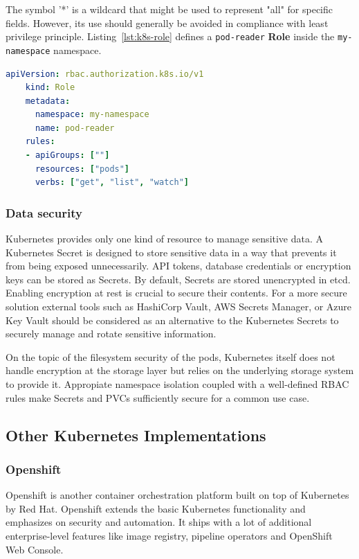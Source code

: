 The symbol '*' is a wildcard that might be used to represent "all" for specific fields. However, its use should generally be avoided in compliance with least privilege principle.
Listing~\ref{lst:k8s-role} defines a \lstinline{pod-reader} \textbf{Role} inside the \lstinline{my-namespace} namespace.

\begin{lstlisting}[language=YAML, caption={An example of a Kubernetes Role definition.}, label={lst:k8s-role}]
    apiVersion: rbac.authorization.k8s.io/v1
    kind: Role
    metadata:
      namespace: my-namespace
      name: pod-reader
    rules:
    - apiGroups: [""]
      resources: ["pods"]
      verbs: ["get", "list", "watch"]
\end{lstlisting}

\subsubsection*{Data security}

Kubernetes provides only one kind of resource to manage sensitive data. A Kubernetes Secret is designed to store sensitive data in a way that prevents it from being exposed unnecessarily. API tokens, database credentials or encryption keys can be stored as Secrets. By default, Secrets are stored unencrypted in etcd. Enabling encryption at rest is crucial to secure their contents. For a more secure solution external tools such as HashiCorp Vault, AWS Secrets Manager, or Azure Key Vault should be considered as an alternative to the Kubernetes Secrets to securely manage and rotate sensitive information.

On the topic of the filesystem security of the pods, Kubernetes itself does not handle encryption at the storage layer but relies on the underlying storage system to provide it. Appropiate namespace isolation coupled with a well-defined RBAC rules make Secrets and PVCs sufficiently secure for a common use case.

\subsection{Other Kubernetes Implementations}
\label{sec:other-kubernetes-implementations}

\subsubsection*{Openshift}

Openshift is another container orchestration platform built on top of Kubernetes by Red Hat. Openshift extends the basic Kubernetes functionality and emphasizes on security and automation. It ships with a lot of additional enterprise-level features like image registry, pipeline operators and OpenShift Web Console.

